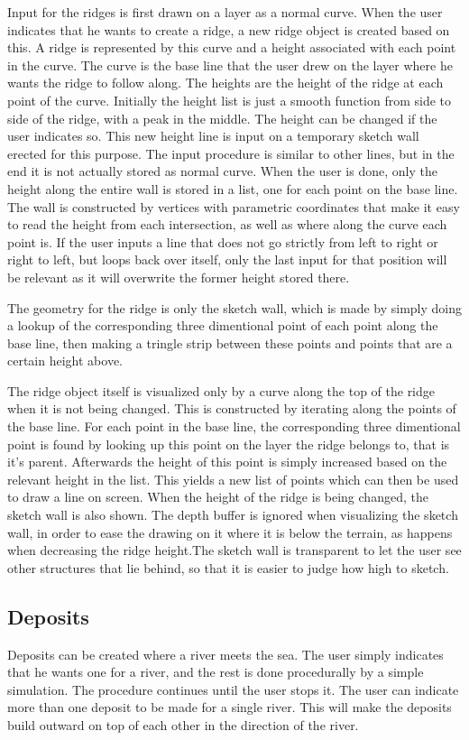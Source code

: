 \documentclass[a4paper,12pt]{report}
\begin{document}
Input for the ridges is first drawn on a layer as a normal curve. When the user indicates that he wants to create a ridge, a new ridge object is created based on this. A ridge is represented by this curve and a height associated with each point in the curve. The curve is the base line that the user drew on the layer where he wants the ridge to follow along. The heights are the height of the ridge at each point of the curve. Initially the height list is just a smooth function from side to side of the ridge, with a peak in the middle. The height can be changed if the user indicates so. This new height line is input on a temporary sketch wall erected for this purpose. The input procedure is similar to other lines, but in the end it is not actually stored as normal curve. When the user is done, only the height along the entire wall is stored in a list, one for each point on the base line. The wall is constructed by vertices with parametric coordinates that make it easy to read the height from each intersection, 
as 
well as where along the curve each point is. If the user inputs a line that does not go strictly from left to right or right to left, but loops back over itself, only the last input for that position will be relevant as it will overwrite the former height stored there.

The geometry for the ridge is only the sketch wall, which is made by simply doing a lookup of the corresponding three dimentional point of each point along the base line, then making a tringle strip between these points and points that are a certain height above.

The ridge object itself is visualized only by a curve along the top of the ridge when it is not being changed. This is constructed by iterating along the points of the base line. For each point in the base line, the corresponding three dimentional point is found by looking up this point on the layer the ridge belongs to, that is it's parent. Afterwards the height of this point is simply increased based on the relevant height in the list. This yields a new list of points which can then be used to draw a line on screen. When the height of the ridge is being changed, the sketch wall is also shown. The depth buffer is ignored when visualizing the sketch wall, in order to ease the drawing on it where it is below the terrain, as happens when decreasing the ridge height.The sketch wall is transparent to let the user see other structures that lie behind, so that it is easier to judge how high to sketch.

\subsection{Deposits}
Deposits can be created where a river meets the sea. The user simply indicates that he wants one for a river, and the rest is done procedurally by a simple simulation. The procedure continues until the user stops it. The user can indicate more than one deposit to be made for a single river. This will make the deposits build outward on top of each other in the direction of the river.
\end{document}

